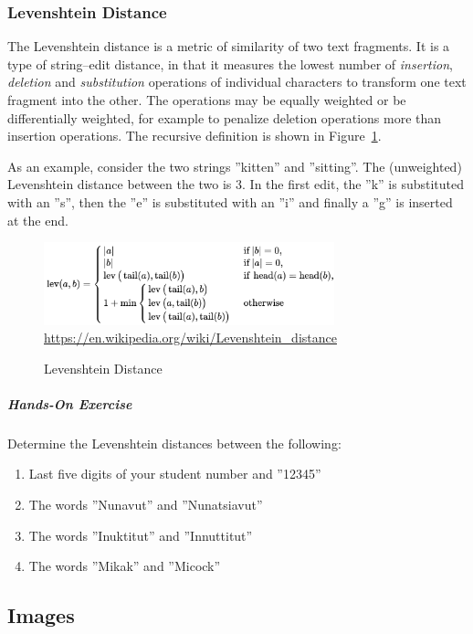 \subsubsection*{Levenshtein Distance}

The Levenshtein distance is a metric of similarity of two text fragments. It is a type of string--edit distance, in that it measures the lowest number of \emph{insertion}, \emph{deletion} and \emph{substitution} operations of individual characters to transform one text fragment into the other. The operations may be equally weighted or be differentially weighted, for example to penalize deletion operations more than insertion operations. The recursive definition is shown in Figure~\ref{fig:levenshtein}. 

As an example, consider the two strings ''kitten'' and ''sitting''. The (unweighted) Levenshtein distance between the two is 3. In the first edit, the ''k'' is substituted with an ''s'', then the ''e'' is substituted with an ''i'' and finally a ''g'' is inserted at the end.

\begin{figure}
\centering
\includegraphics[width=0.75\textwidth]{screen6.png} \\

\scriptsize
\url{https://en.wikipedia.org/wiki/Levenshtein_distance}
\caption{Levenshtein Distance}
\label{fig:levenshtein}
\end{figure}


\begin{tcolorbox}[colback=code]
\subparagraph*{Hands-On Exercise} 
Determine the Levenshtein distances between the following:
\begin{enumerate}
  \item Last five digits of your student number and ''12345''
  \item The words ''Nunavut'' and ''Nunatsiavut''
  \item The words ''Inuktitut'' and ''Innuttitut''
  \item The words ''Mikak'' and ''Micock''
\end{enumerate}
\end{tcolorbox}


\subsection*{Images}


